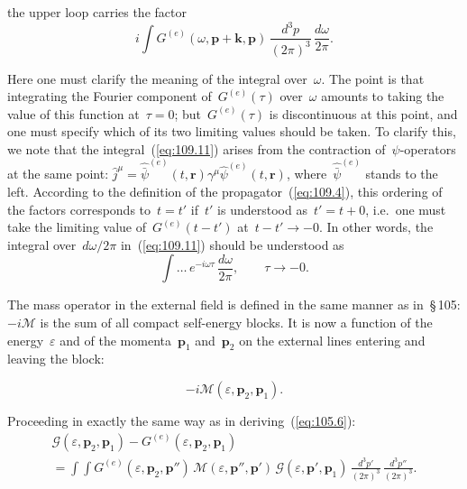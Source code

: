 
\noindent the upper loop carries the factor
\begin{equation}
i\!\int G^{(e)}(\omega, \mathbf{p} + \mathbf{k}, \mathbf{p})\,\frac{d^3p}{(2\pi)^3}\,\frac{d\omega}{2\pi}.
\label{eq:109.11}
\end{equation}

Here one must clarify the meaning of the integral over~$\omega$. The point is that integrating the Fourier component of~$G^{(e)}(\tau)$ over~$\omega$ amounts to taking the value of this function at~$\tau = 0$; but~$G^{(e)}(\tau)$ is discontinuous at this point, and one must specify which of its two limiting values should be taken. To clarify this, we note that the integral~(\ref{eq:109.11}) arises from the contraction of~$\psi$-operators at the same point: $\hat{j}^\mu = \hat{\bar{\psi}}^{(e)}(t, \mathbf{r})\gamma^\mu\hat{\psi}^{(e)}(t, \mathbf{r})$, where~$\hat{\bar{\psi}}^{(e)}$ stands to the left. According to the definition of the propagator~(\ref{eq:109.4}), this ordering of the factors corresponds to~$t = t'$ if~$t'$ is understood as~$t' = t + 0$, i.e.\ one must take the limiting value of~$G^{(e)}(t - t')$ at~$t - t' \to -0$. In other words, the integral over~$d\omega/2\pi$ in~(\ref{eq:109.11}) should be understood as
\begin{equation}
\int\!\ldots\,e^{-i\omega\tau}\,\frac{d\omega}{2\pi}, \qquad \tau \to -0.
\label{eq:109.12}
\end{equation}

The mass operator in the external field is defined in the same manner as in~\S\,105: $-i\mathcal{M}$ is the sum of all compact self-energy blocks. It is now a function of the energy~$\varepsilon$ and of the momenta~$\mathbf{p}_1$ and~$\mathbf{p}_2$ on the external lines entering and leaving the block:

\begin{equation}
-i\mathcal{M}(\varepsilon, \mathbf{p}_2, \mathbf{p}_1).
\label{eq:109.13}
\end{equation}

Proceeding in exactly the same way as in deriving~(\ref{eq:105.6}):
\begin{multline}
\mathcal{G}(\varepsilon, \mathbf{p}_2, \mathbf{p}_1) - G^{(e)}(\varepsilon, \mathbf{p}_2, \mathbf{p}_1) \\
= \int\!\!\int G^{(e)}(\varepsilon, \mathbf{p}_2, \mathbf{p}'')\,\mathcal{M}(\varepsilon, \mathbf{p}'', \mathbf{p}')\,\mathcal{G}(\varepsilon, \mathbf{p}', \mathbf{p}_1)\,\frac{d^3p'}{(2\pi)^3}\,\frac{d^3p''}{(2\pi)^3}.
\label{eq:109.14}
\end{multline}

